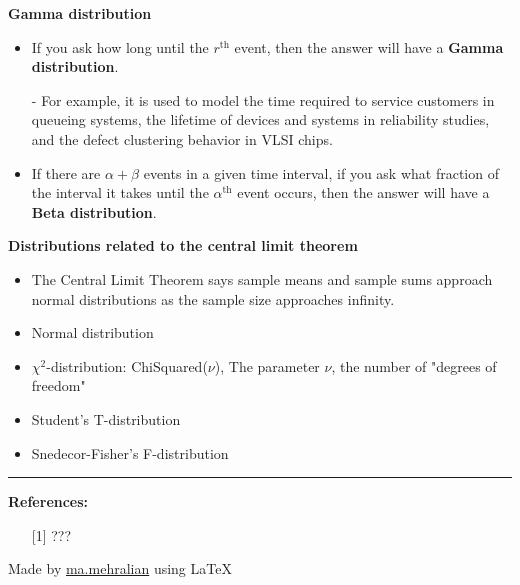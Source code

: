 \documentclass{../cheat}
\begin{document}
\begin{multicols}{3}
	\textbf{Gamma distribution}
	\begin{itemize}
	 	\item If you ask how long until the $r^\text{th}$ event, then the answer will have a \textbf{Gamma distribution}.
	 	\item [-] For example, it is used to model the time required to service customers in queueing systems, the lifetime of devices and systems in reliability studies, and the defect clustering behavior in VLSI chips.
	 	\item If there are $\alpha+\beta$ events in a given time interval, if you ask what fraction of the interval it takes until the $\alpha^\text{th}$ event occurs, then the answer will have a \textbf{Beta distribution}.
	 \end{itemize}
	 
	\textbf{Distributions related to the central limit theorem}
	\begin{itemize}
		\item The Central Limit Theorem says sample means and sample sums approach normal distributions as the sample size approaches infinity.
		\item Normal distribution
		\item $\chi^2$-distribution: ChiSquared($\nu$), The parameter $\nu$, the number of "degrees of freedom"
		\item Student’s T-distribution
		\item Snedecor-Fisher’s F-distribution
	\end{itemize}
	
\vspace{5mm}
\rule{0.3\linewidth}{0.25pt}
\scriptsize

\textbf{References:}
\begin{itemize}[leftmargin=2em]
	\item [{[1]}] ??? 

\end{itemize}
Made by \href{http://webpages.iust.ac.ir/mehralian/}{ma.mehralian} using \LaTeX
\end{multicols}
\end{document}
